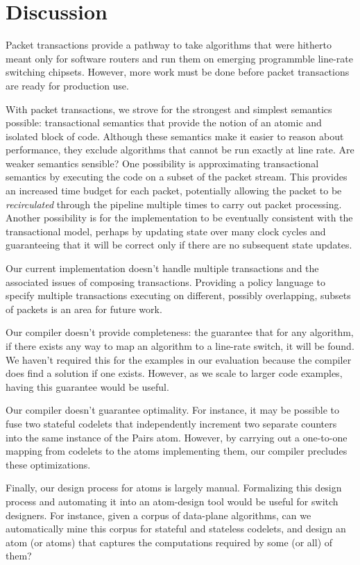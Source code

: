 \section{Discussion}
Packet transactions provide a pathway to take algorithms that were hitherto
meant only for software routers and run them on emerging programmble line-rate
switching chipsets. However, more work must be done before packet transactions
are ready for production use.

\begin{CompactEnumerate}
\item With packet transactions, we strove for the strongest and simplest
semantics possible: transactional semantics that provide the notion of an
atomic and isolated block of code. Although these semantics make it easier to
reason about performance, they exclude algorithms that cannot be run exactly at
line rate. Are weaker semantics sensible? One possibility is approximating
transactional semantics by executing the code on a subset of the packet stream.
This provides an increased time budget for each packet, potentially allowing
the packet to be {\em recirculated} through the pipeline multiple times to
carry out packet processing. Another possibility is for the implementation to
be eventually consistent with the transactional model, perhaps by updating
state over many clock cycles and guaranteeing that it will be correct only if
there are no subsequent state updates.
\item Our current implementation doesn't handle multiple transactions and the
associated issues of composing transactions. Providing a policy language to
specify multiple transactions executing on different, possibly overlapping,
subsets of packets is an area for future work.
\item Our compiler doesn't provide completeness: the guarantee that for any
algorithm, if there exists any way to map an algorithm to a line-rate switch,
it will be found. We haven't required this for the examples in our evaluation
because the compiler does find a solution if one exists. However, as we scale
to larger code examples, having this guarantee would be useful.
\item Our compiler doesn't guarantee optimality. For instance, it may be
possible to fuse two stateful codelets that independently increment two
separate counters into the same instance of the Pairs atom. However, by
carrying out a one-to-one mapping from codelets to the atoms implementing them,
our compiler precludes these optimizations. 
\item Finally, our design process for atoms is largely manual.  Formalizing
this design process and automating it into an atom-design tool would be useful
for switch designers. For instance, given a corpus of data-plane algorithms,
can we automatically mine this corpus for stateful and stateless codelets, and
design an atom (or atoms) that captures the computations required by some (or
all) of them?
\end{CompactEnumerate}
